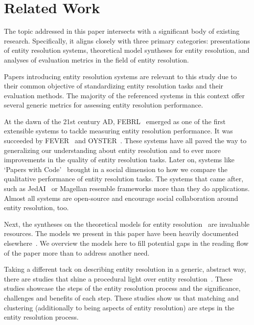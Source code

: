 \documentclass[journal]{IEEEtran}
\begin{document}
    \section{Related Work}\label{sec:Related Work}
    
    The topic addressed in this paper intersects with a significant body of
    existing research.
    Specifically, it aligns closely with three primary categories: presentations
    of entity resolution systems, theoretical model syntheses for entity
    resolution, and analyses of evaluation metrics in the field of entity
    resolution.

    Papers introducing entity resolution systems are relevant to this study due
    to their common objective of standardizing entity resolution tasks and their
    evaluation methods.
    The majority of the referenced systems in this context offer several generic
    metrics for assessing entity resolution performance.

    At the dawn of the 21st century AD, FEBRL~\cite{febrl2002} emerged as one of
    the first extensible systems to tackle measuring entity resolution
    performance.
    It was succeeded by FEVER~\cite{fever2009} and OYSTER~\cite{oyster2012}.
    These systems have all paved the way to generalizing our understanding about
    entity resolution and to ever more improvements in the quality of entity
    resolution tasks.
    Later on, systems like `Papers with Code'~\cite{papwithcode2019} brought in
    a social dimension to how we compare the qualitative performance of entity
    resolution tasks.
    The systems that came after, such as JedAI~\cite{jedai2017} or Magellan
    \cite{magellan2020} resemble frameworks more than they do
    applications.
    Almost all systems are open-source and encourage social collaboration around
    entity resolution, too.
    
    Next, the syntheses on the theoretical models for entity
    resolution~\cite{fs1969,Ben2009Swoosh,Tal11} are invaluable resources.
    The models we present in this paper have been heavily documented
    elsewhere~\cite{Tal11,tal2013}.    
    We overview the models here to fill potential gaps in the reading flow of
    the paper more than to address another need.
    
    Taking a different tack on describing entity resolution in a generic,
    abstract way, there are studies that shine a procedural light over entity
    resolution~\cite{Pap19,Chen09}.
    These studies showcase the steps of the entity resolution process and the
    significance, challenges and benefits of each step.
    These studies show us that matching and clustering (additionally to being
    aspects of entity resolution) are steps in the entity resolution process.
\end{document}
